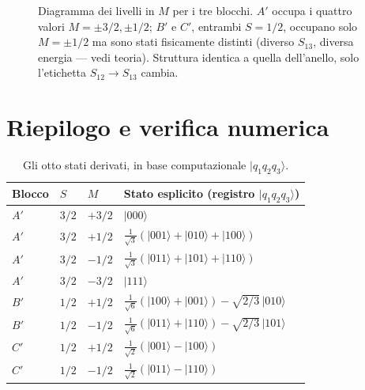 \documentclass[11pt,a4paper]{article}
\begin{document}
\FloatBarrier
\begin{figure}[h]
\centering
{}
\caption{Diagramma dei livelli in $M$ per i tre blocchi. $A'$ occupa i
quattro valori $M=\pm3/2,\pm1/2$; $B'$ e $C'$, entrambi $S=1/2$, occupano
solo $M=\pm1/2$ ma sono stati fisicamente distinti (diverso $S_{13}$,
diversa energia — vedi teoria). Struttura identica a quella dell'anello,
solo l'etichetta $S_{12}\to S_{13}$ cambia.}
\end{figure}
\FloatBarrier

\section{Riepilogo e verifica numerica}
\label{sec:verifica}

\begin{table}[h]
\centering
\begin{tabular}{@{}llll@{}}
\toprule
Blocco & $S$ & $M$ & Stato esplicito (registro $|q_1q_2q_3\rangle$)\\
\midrule
$A'$ & $3/2$ & $+3/2$ & $|000\rangle$\\
$A'$ & $3/2$ & $+1/2$ & $\tfrac1{\sqrt3}(|001\rangle+|010\rangle+|100\rangle)$\\
$A'$ & $3/2$ & $-1/2$ & $\tfrac1{\sqrt3}(|011\rangle+|101\rangle+|110\rangle)$\\
$A'$ & $3/2$ & $-3/2$ & $|111\rangle$\\
$B'$ & $1/2$ & $+1/2$ & $\tfrac1{\sqrt6}(|100\rangle+|001\rangle) - \sqrt{2/3}\,|010\rangle$\\
$B'$ & $1/2$ & $-1/2$ & $\tfrac1{\sqrt6}(|011\rangle+|110\rangle) - \sqrt{2/3}\,|101\rangle$\\
$C'$ & $1/2$ & $+1/2$ & $\tfrac1{\sqrt2}(|001\rangle-|100\rangle)$\\
$C'$ & $1/2$ & $-1/2$ & $\tfrac1{\sqrt2}(|011\rangle-|110\rangle)$\\
\bottomrule
\end{tabular}
\caption{Gli otto stati derivati, in base computazionale $|q_1q_2q_3\rangle$.}
\label{tab:stati}
\end{table}
\end{document}
